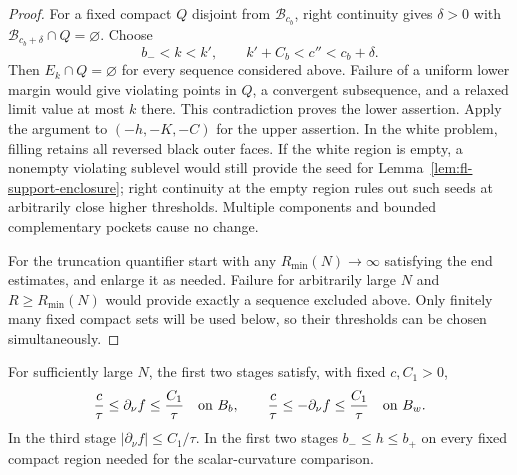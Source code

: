 \begin{proof}
For a fixed compact $Q$ disjoint from $\mathcal B_{c_b}$, right
continuity gives $\delta>0$ with
$\mathcal B_{c_b+\delta}\cap Q=\varnothing$.  Choose
\[
 b_-<k<k',\qquad k'+C_b<c''<c_b+\delta.
\]
Then $E_k\cap Q=\varnothing$ for every sequence considered above.
Failure of a uniform lower margin would give violating points in
$Q$, a convergent subsequence, and a relaxed limit value at most
$k$ there.  This contradiction proves the lower assertion.
Apply the argument to $(-h,-K,-C)$ for the upper assertion.  In
the white problem, filling retains all reversed black outer faces.
If the white region is empty, a nonempty violating sublevel would
still provide the seed for Lemma~\ref{lem:fl-support-enclosure};
right continuity at the empty region rules out such seeds at
arbitrarily close higher thresholds.  Multiple components and
bounded complementary pockets cause no change.

For the truncation quantifier start with any $R_{\min}(N)\to\infty$
satisfying the end estimates, and enlarge it as needed.  Failure
for arbitrarily large $N$ and $R\ge R_{\min}(N)$ would provide
exactly a sequence excluded above.  Only finitely many fixed
compact sets will be used below, so their thresholds can be
chosen simultaneously.
\end{proof}

\begin{lemma}\label{lem:fc-collar-slopes}
For sufficiently large $N$, the first two stages satisfy, with
fixed $c,C_1>0$,
\begin{equation}\label{eq:fc-signed-slopes}
 \frac c\tau\le\partial_\nu f\le\frac{C_1}\tau\quad\hbox{on }B_b,
 \qquad
 \frac c\tau\le-\partial_\nu f\le\frac{C_1}\tau\quad\hbox{on }B_w.
\end{equation}
In the third stage $|\partial_\nu f|\le C_1/\tau$.  In the first
two stages $b_-\le h\le b_+$ on every fixed compact region needed
for the scalar-curvature comparison.
\end{lemma}


